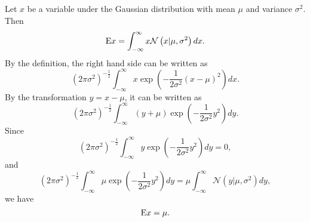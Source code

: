\subsection{}
\label{1.8}
Let $x$ be a variable under the Gaussian distribution with mean $\mu$ and variance $\sigma ^ 2$.
Then
%
\begin{equation}
{\rm E} x = \int_{-\infty}^{\infty} x \mathcal{N} \left( x | \mu, \sigma ^ 2 \right) dx.
\end{equation}
%
By the definition, the right hand side can be written as
%
\begin{equation}
\left( 2 \pi \sigma ^ 2 \right) ^ {-\frac{1}{2}} \int_{-\infty}^{\infty} x \exp \left( -\frac{1}{2 \sigma ^ 2} (x - \mu) ^ 2 \right) dx.
\end{equation}
%
By the transformation $y = x - \mu$, it can be written as 
%
\begin{equation}
\left( 2 \pi \sigma ^ 2 \right) ^ {-\frac{1}{2}} \int_{-\infty}^{\infty} (y + \mu) \exp \left( -\frac{1}{2 \sigma ^ 2}y ^ 2 \right) dy.
\end{equation}
%
Since 
%
\begin{equation}
\left( 2 \pi \sigma ^ 2 \right) ^ {-\frac{1}{2}} \int_{-\infty}^{\infty} y \exp \left( -\frac{1}{2 \sigma ^ 2}y ^ 2 \right) dy = 0,
\end{equation}
%
and
%
\begin{equation}
\left( 2 \pi \sigma ^ 2 \right) ^ {-\frac{1}{2}} \int_{-\infty}^{\infty} \mu \exp \left( -\frac{1}{2 \sigma ^ 2}y ^ 2 \right) dy = \mu \int_{- \infty}^{\infty} \mathcal{N} \left( y | \mu, \sigma ^ 2 \right) dy,
\end{equation}
%
we have
%
\begin{equation}
{\rm E} x = \mu.
\end{equation}
%

